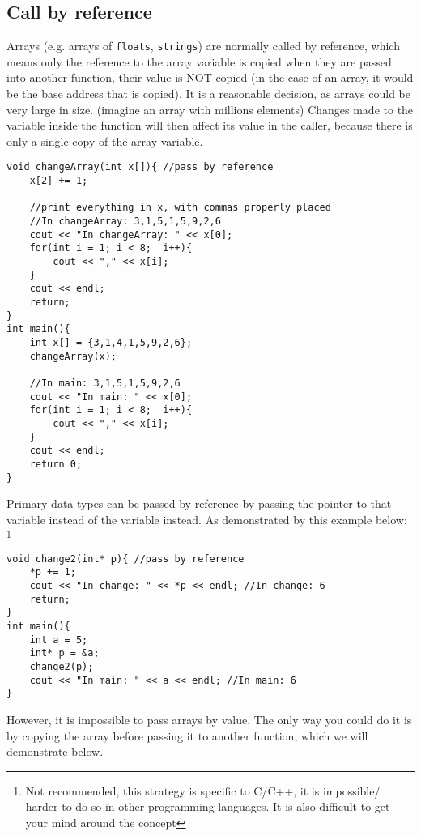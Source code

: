 \subsection{Call by reference}

Arrays (e.g. arrays of \texttt{floats}, \texttt{strings}) are normally called by reference, which means only the reference to the array variable is copied when they are passed into another function, their value is NOT copied (in the case of an array, it would be the base address that is copied). It is a reasonable decision, as arrays could be very large in size. (imagine an array with millions elements) Changes made to the variable inside the function will then affect its value in the caller, because there is only a single copy of the array variable.

\begin{lstlisting}
void changeArray(int x[]){ //pass by reference
    x[2] += 1;
    
    //print everything in x, with commas properly placed
    //In changeArray: 3,1,5,1,5,9,2,6
    cout << "In changeArray: " << x[0];
    for(int i = 1; i < 8;  i++){
        cout << "," << x[i];
    }
    cout << endl;
    return;
}
int main(){
    int x[] = {3,1,4,1,5,9,2,6};
    changeArray(x);
    
    //In main: 3,1,5,1,5,9,2,6
    cout << "In main: " << x[0];
    for(int i = 1; i < 8;  i++){
        cout << "," << x[i];
    }
    cout << endl;
    return 0;
}
\end{lstlisting}

Primary data types can be passed by reference by passing the pointer to that variable instead of the variable instead. As demonstrated by this example below: \footnote{Not recommended, this strategy is specific to C/C++, it is impossible/ harder to do so in other programming languages. It is also difficult to get your mind around the concept}

\begin{lstlisting}
void change2(int* p){ //pass by reference
    *p += 1;
    cout << "In change: " << *p << endl; //In change: 6
    return;
}
int main(){
    int a = 5;
    int* p = &a;
    change2(p);
    cout << "In main: " << a << endl; //In main: 6
}
\end{lstlisting}

However, it is impossible to pass arrays by value. The only way you could do it is by copying the array before passing it to another function, which we will demonstrate below.

